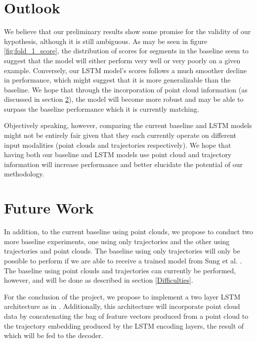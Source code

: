 \documentclass[letterpaper, 12 pt, conference]{ieeeconf}
\begin{document}
\section{Outlook}

We believe that our preliminary results show some promise for the validity of our hypothesis, although it is still ambiguous. As may be seen in figure \ref{fig:fold_1_score}, the distribution of scores for segments in the baseline seem to suggest that the model will either perform very well or very poorly on a given example. Conversely, our LSTM model's scores follows a much smoother decline in performance, which might suggest that it is more generalizable than the baseline. We hope that through the incorporation of point cloud information (as discussed in section \ref{Future Work}), the model will become more robust and may be able to surpass the baseline performance which it is currently matching.  
\par
Objectively speaking, however, comparing the current baseline and LSTM models might not be entirely fair given that they each currently operate on different input modalities (point clouds and trajectories respectively). We hope that having both our baseline and LSTM models use point cloud and trajectory information will increase performance and better elucidate the potential of our methodology. 

\section{Future Work}\label{Future Work}

In addition, to the current baseline using point clouds, we propose to conduct two more baseline experiments, one using only trajectories and the other using trajectories and point clouds. The baseline using only trajectories will only be possible to perform if we are able to receive a trained model from Sung et al. \cite{sung2016robobarista}. The baseline using point clouds and trajectories can currently be performed, however, and will be done as described in section \ref{Difficulties}. 

For the conclusion of the project, we propose to implement a two layer LSTM architecture as in \cite{Venugopalan_2015_ICCV}. Additionally, this architecture will incorporate point cloud data by concatenating the bag of feature vectors produced from a point cloud to the trajectory embedding produced by the LSTM encoding layers, the result of which will be fed to the decoder. 
\end{document}

